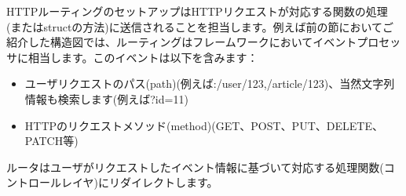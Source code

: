 HTTPルーティングのセットアップはHTTPリクエストが対応する関数の処理(またはstructの方法)に送信されることを担当します。例えば前の節においてご紹介した構造図では、ルーティングはフレームワークにおいてイベントプロセッサに相当します。このイベントは以下を含みます：



\begin{itemize}
  \item ユーザリクエストのパス(path)(例えば:/user/123,/article/123)、当然文字列情報も検索します(例えば?id=11)
  \item HTTPのリクエストメソッド(method)(GET、POST、PUT、DELETE、PATCH等)
\end{itemize}

ルータはユーザがリクエストしたイベント情報に基づいて対応する処理関数(コントロールレイヤ)にリダイレクトします。
